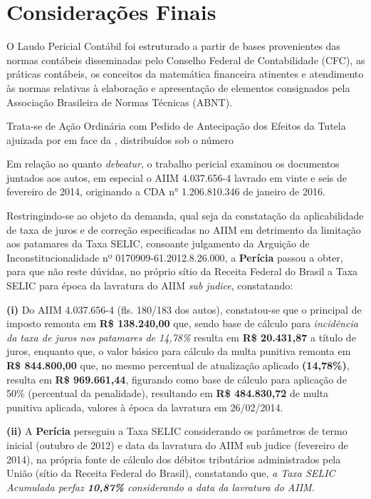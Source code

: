 \section{Considerações Finais}
O Laudo Pericial Contábil foi estruturado a partir de bases provenientes das normas contábeis disseminadas pelo Conselho Federal de Contabilidade (CFC), as práticas contábeis, os conceitos da matemática financeira atinentes e atendimento às normas relativas à elaboração e apresentação de elementos consignados pela Associação Brasileira de Normas Técnicas (ABNT).

Trata-se de Ação Ordinária com Pedido de Antecipação dos Efeitos da Tutela ajuizada por \textbf{\requerente} em face da \textbf{\requerida}, distribuídos sob o número \textbf{\processo}

Em relação ao quanto \textit{debeatur}, o trabalho pericial examinou os documentos juntados aos autos, em especial o AIIM 4.037.656-4 lavrado em vinte e seis de fevereiro de 2014,
originando a CDA n° 1.206.810.346 de janeiro de 2016.

Restringindo-se ao objeto da demanda, qual seja da constatação da aplicabilidade de taxa de juros e de correção especificadas no AIIM em detrimento da limitação aos patamares da Taxa SELIC, consoante julgamento da Arguição de Inconstitucionalidade nº 0170909-61.2012.8.26.000, a \textbf{Perícia} passou a obter, para que não reste dúvidas, no próprio sítio da Receita Federal do Brasil a Taxa SELIC para época da lavratura do AIIM \textit{sub judice}, constatando:

\textbf{(i)} Do AIIM 4.037.656-4 (fls. 180/183 dos autos), constatou-se que o principal de imposto remonta em \textbf{R\$ 138.240,00} que, sendo base de cálculo para \textit{incidência da taxa de juros nos patamares de 14,78\%} resulta em \textbf{R\$ 20.431,87} a título de juros, enquanto que, o valor básico para cálculo da multa punitiva remonta em \textbf{R\$ 844.800,00} que, no mesmo percentual de atualização aplicado \textbf{(14,78\%)}, resulta em \textbf{R\$ 969.661,44}, figurando como base de cálculo para aplicação de 50\% (percentual da penalidade), resultando em \textbf{R\$ 484.830,72} de multa punitiva aplicada, valores à época da lavratura em 26/02/2014.

\textbf{(ii)} A \textbf{Perícia} perseguiu a Taxa SELIC considerando os parâmetros de termo inicial (outubro de 2012) e data da lavratura do AIIM sub judice (fevereiro de 2014), na própria fonte de cálculo dos débitos tributários administrados pela União (sítio da Receita Federal do Brasil), constatando que, \textit{a Taxa SELIC Acumulada perfaz \textbf{10,87\%} considerando a data da lavratura do AIIM}.

